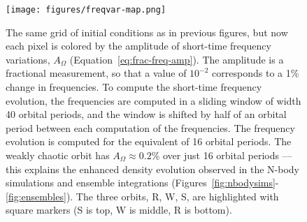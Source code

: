 \documentclass[letterpaper,12pt,preprint]{aastex}
\begin{document}
\clearpage
\begin{figure}[p]
\begin{center}
\texttt{[image: figures/freqvar-map.png]}
\caption{The same grid of initial conditions as in previous figures, but now each pixel is colored by the amplitude of short-time frequency variations, $A_\Omega$ (Equation~\ref{eq:frac-freq-amp}). The amplitude is a fractional measurement, so that a value of $10^{-2}$ corresponds to a 1\% change in frequencies. To compute the short-time frequency evolution, the frequencies are computed in a sliding window of width 40 orbital periods, and the window is shifted by half of an orbital period between each computation of the frequencies. The frequency evolution is computed for the equivalent of 16 orbital periods. The weakly chaotic orbit has $A_\Omega \approx 0.2\%$ over just 16 orbital periods --- this explains the enhanced density evolution observed in the N-body simulations and ensemble integrations (Figures~\ref{fig:nbodysims}-\ref{fig:ensembles}). The three orbits, R, W, S, are highlighted with square markers (S is top, W is middle, R is bottom). } 
\label{fig:freqvar_map}
\end{center}
\end{figure}
\end{document}

